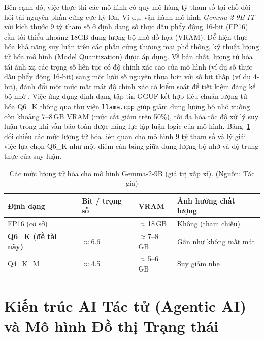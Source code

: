 Bên cạnh đó, việc thực thi các mô hình có quy mô hàng tỷ tham số tại chỗ đòi hỏi tài nguyên phần cứng cực kỳ lớn. Ví dụ, vận hành mô hình \textit{Gemma-2-9B-IT} với kích thước 9 tỷ tham số ở định dạng số thực dấu phẩy động 16-bit (FP16) cần tối thiểu khoảng 18GB dung lượng bộ nhớ đồ họa (VRAM). Để hiện thực hóa khả năng suy luận trên các phần cứng thương mại phổ thông, kỹ thuật lượng tử hóa mô hình (Model Quantization) được áp dụng. Về bản chất, lượng tử hóa tái ánh xạ các trọng số liên tục có độ chính xác cao của mô hình (ví dụ số thực dấu phẩy động 16-bit) sang một lưới số nguyên thưa hơn với số bit thấp (ví dụ 4-bit), đánh đổi một mức mất mát độ chính xác có kiểm soát để tiết kiệm đáng kể bộ nhớ \cite{quantization2021}. Việc ứng dụng định dạng tập tin GGUF kết hợp tiêu chuẩn lượng tử hóa Q6\_K thông qua thư viện \texttt{llama.cpp} giúp giảm dung lượng bộ nhớ xuống còn khoảng 7--8\,GB VRAM (mức cắt giảm trên 50\%), tối đa hóa tốc độ xử lý suy luận trong khi vẫn bảo toàn được năng lực lập luận logic của mô hình. Bảng~\ref{tab:quantization} đối chiếu các mức lượng tử hóa liên quan cho mô hình 9 tỷ tham số và lý giải việc lựa chọn Q6\_K như một điểm cân bằng giữa dung lượng bộ nhớ và độ trung thực của suy luận.

\begin{table}[!htbp]
    \centering
    \caption{Các mức lượng tử hóa cho mô hình Gemma-2-9B (giá trị xấp xỉ). (Nguồn: Tác giả)}
    \label{tab:quantization}
    \begin{tabular}{|>{\raggedright\arraybackslash}p{}|>{\centering\arraybackslash}p{}|>{\centering\arraybackslash}p{}|>{\raggedright\arraybackslash}p{}|}
        \hline
        \textbf{Định dạng} & \textbf{Bit / trọng số} & \textbf{VRAM} & \textbf{Ảnh hưởng chất lượng} \\
        \hline
        FP16 (cơ sở) & 16 & $\approx$18\,GB & Không (tham chiếu) \\
        \hline
        \textbf{Q6\_K (đề tài này)} & $\approx$6.6 & $\approx$7--8\,GB & Gần như không mất mát \\
        \hline
        Q4\_K\_M & $\approx$4.5 & $\approx$5--6\,GB & Suy giảm nhẹ \\
        \hline
    \end{tabular}
\end{table}

\section{Kiến trúc AI Tác tử (Agentic AI) và Mô hình Đồ thị Trạng thái}

